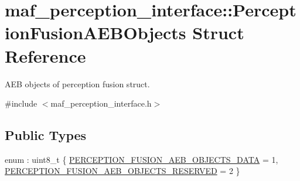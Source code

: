 \hypertarget{structmaf__perception__interface_1_1PerceptionFusionAEBObjects}{}\section{maf\+\_\+perception\+\_\+interface\+:\+:Perception\+Fusion\+A\+E\+B\+Objects Struct Reference}
\label{structmaf__perception__interface_1_1PerceptionFusionAEBObjects}


A\+EB objects of perception fusion struct.  




{\ttfamily \#include $<$maf\+\_\+perception\+\_\+interface.\+h$>$}

\subsection*{Public Types}
\begin{DoxyCompactItemize}
\item 
enum \+: uint8\+\_\+t \{ \hyperlink{structmaf__perception__interface_1_1PerceptionFusionAEBObjects_a553cda51d497a3cc79eace363ebec69daa8b299aeba1d56bff0c3b64b2f563f1f}{P\+E\+R\+C\+E\+P\+T\+I\+O\+N\+\_\+\+F\+U\+S\+I\+O\+N\+\_\+\+A\+E\+B\+\_\+\+O\+B\+J\+E\+C\+T\+S\+\_\+\+D\+A\+TA} = 1, 
\hyperlink{structmaf__perception__interface_1_1PerceptionFusionAEBObjects_a553cda51d497a3cc79eace363ebec69dad1f578e43f2d1a8e75168dda43893f99}{P\+E\+R\+C\+E\+P\+T\+I\+O\+N\+\_\+\+F\+U\+S\+I\+O\+N\+\_\+\+A\+E\+B\+\_\+\+O\+B\+J\+E\+C\+T\+S\+\_\+\+R\+E\+S\+E\+R\+V\+ED} = 2
 \}
\end{DoxyCompactItemize}
